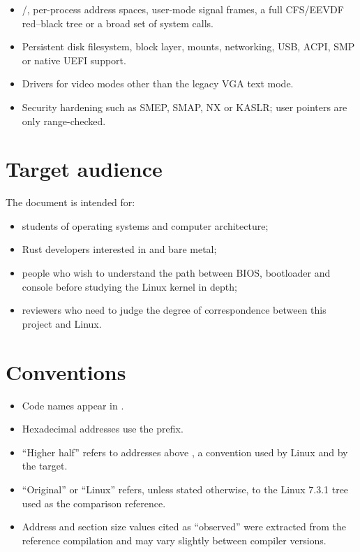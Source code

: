 \begin{itemize}
  \item {}/, per-process address spaces, user-mode signal
        frames, a full CFS/EEVDF red--black tree or a broad set of system
        calls.
  \item Persistent disk filesystem, block layer, mounts, networking, USB,
        ACPI, SMP or native UEFI support.
  \item Drivers for video modes other than the legacy VGA text mode.
  \item Security hardening such as SMEP, SMAP, NX or KASLR; user pointers are
        only range-checked.
\end{itemize}

\section{Target audience}

The document is intended for:

\begin{itemize}
  \item students of operating systems and computer architecture;
  \item Rust developers interested in  and bare metal;
  \item people who wish to understand the path between BIOS, bootloader and
        console before studying the Linux kernel in depth;
  \item reviewers who need to judge the degree of correspondence between this
        project and Linux.
\end{itemize}

\section{Conventions}

\begin{itemize}
  \item Code names appear in .
  \item Hexadecimal addresses use the  prefix.
  \item ``Higher half'' refers to addresses above
        , a convention used by Linux and by the
         target.
  \item ``Original'' or ``Linux'' refers, unless stated otherwise, to the Linux
        7.3.1 tree used as the comparison reference.
  \item Address and section size values cited as ``observed'' were extracted
        from the reference compilation and may vary slightly between compiler
        versions.
\end{itemize}

